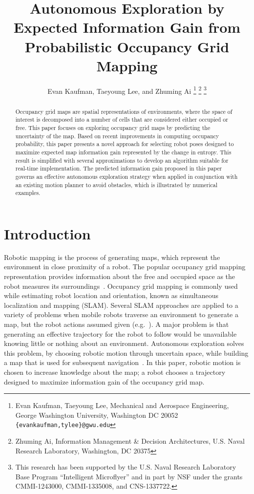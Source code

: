 \documentclass[letterpaper, 10pt, conference]{ieeeconf}
\title{\LARGE \bf
Autonomous Exploration by Expected Information Gain from Probabilistic Occupancy Grid Mapping
}
\author{Evan Kaufman, Taeyoung Lee, and Zhuming Ai%
\thanks{Evan Kaufman, Taeyoung Lee, Mechanical and Aerospace Engineering, George Washington University, Washington DC 20052 {\tt \{evankaufman,tylee\}@gwu.edu}}
\thanks{Zhuming Ai, Information Management \& Decision Architectures, U.S. Naval Research Laboratory,  Washington, DC 20375}
\thanks{This research has been supported by the U.S. Naval Research Laboratory Base Program ``Intelligent Microflyer'' and in part by NSF under the grants CMMI-1243000, CMMI-1335008, and CNS-1337722.}
}
\begin{document}
\maketitle
\thispagestyle{empty}
\pagestyle{empty}


\begin{abstract}
Occupancy grid maps are spatial representations of environments, where the space of interest is decomposed into a number of cells that are considered either occupied or free. This paper focuses on exploring occupancy grid maps by predicting the uncertainty of the map. Based on recent improvements in computing occupancy probability, this paper presents a novel approach for selecting robot poses designed to maximize expected map information gain represented by the change in entropy. This result is simplified with several approximations to develop an algorithm suitable for real-time implementation. The predicted information gain proposed in this paper governs an effective autonomous exploration strategy when applied in conjunction with an existing motion planner to avoid obstacles, which is illustrated by numerical examples.
\end{abstract}


\section{Introduction}

Robotic mapping is the process of generating maps, which represent the environment in close proximity of a robot. The popular occupancy grid mapping representation provides information about the free and occupied space as the robot measures its surroundings~\cite{ThrBurFox05}. Occupancy grid mapping is commonly used while estimating robot location and orientation, known as simultaneous localization and mapping (SLAM). Several SLAM approaches are applied to a variety of problems when mobile robots traverse an environment to generate a map, but the robot actions assumed given (e.g.~\cite{ThrBurFox05,DurBai06,CheChe09}). A major problem is that generating an effective trajectory for the robot to follow would be unavailable knowing little or nothing about an environment. 
Autonomous exploration solves this problem, by choosing robotic motion through uncertain space, while building a map that is used for subsequent navigation~\cite{Yam97}.
In this paper, robotic motion is chosen to increase knowledge about the map; a robot chooses a trajectory designed to maximize information gain of the occupancy grid map.
\end{document}
